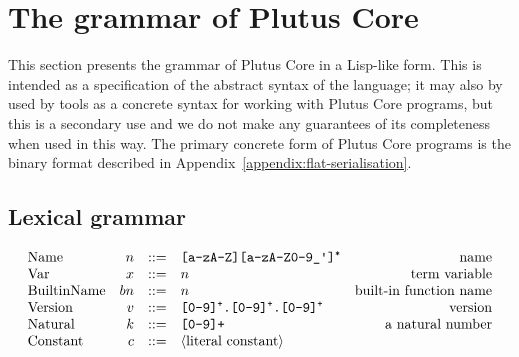 \section{The grammar of Plutus Core}
\label{sec:untyped-plc-grammar}
This section presents the grammar of Plutus Core in a Lisp-like form.  This is
intended as a specification of the abstract syntax of the language; it may also
by used by tools as a concrete syntax for working with Plutus Core programs, but
this is a secondary use and we do not make any guarantees of its completeness
when used in this way.  The primary concrete form of Plutus Core programs is the
binary format described in Appendix~\ref{appendix:flat-serialisation}.

\subsection{Lexical grammar}
\label{sec:untyped-plc}
\thispagestyle{plain}
\pagestyle{plain}

\begin{minipage}{\linewidth}
    \centering
    \[\begin{array}{lrclr}

        \textrm{Name}          & n      & ::= & \texttt{[a-zA-Z][a-zA-Z0-9\_\textquotesingle]\textsuperscript{*}}   & \textrm{name}\\

        \textrm{Var}           & x      & ::= & n & \textrm{term variable}\\
        \textrm{BuiltinName}   & bn     & ::= & n & \textrm{built-in function name}\\
        \textrm{Version} & v & ::= & \texttt{[0-9]\textsuperscript{+}.[0-9]\textsuperscript{+}.[0-9]\textsuperscript{+}}& \textrm{version}\\
        \textrm{Natural}  & k      & ::= & \texttt{[0-9]+} & \textrm{a natural number}\\
        \textrm{Constant} & c & ::= & \langle{\textrm{literal constant}}\rangle& \\

    \end{array}\]
    \label{fig:lexical-grammar-untyped}
\end{minipage}%
%
%
%
%
%
%
%



